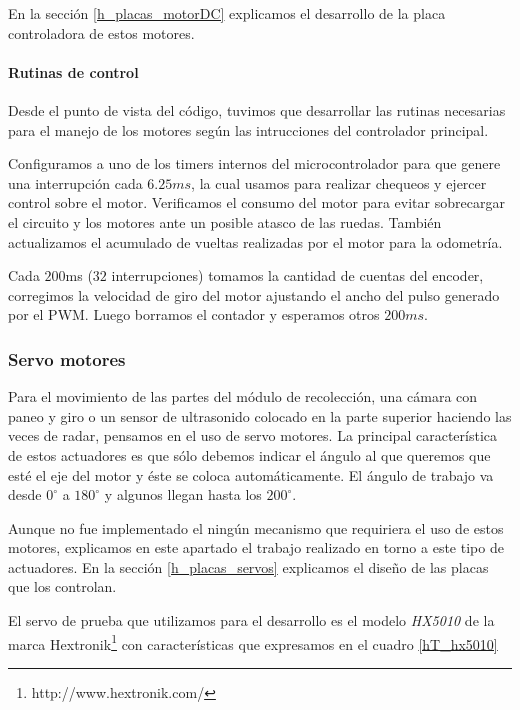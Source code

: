 En la secci\'on \ref{h_placas_motorDC} explicamos el desarrollo de la placa controladora de estos motores.

\paragraph{Rutinas de control}
\label{h_actuadores_motorDC_rutinas}

Desde el punto de vista del c\'odigo, tuvimos que desarrollar las rutinas necesarias para el manejo de los motores seg\'un las intrucciones del
controlador principal.

Configuramos a uno de los timers internos del microcontrolador para que genere una interrupci\'on cada $6.25ms$, la cual usamos para realizar
chequeos y ejercer control sobre el motor.
Verificamos el consumo del motor para evitar sobrecargar el circuito y los motores ante un posible atasco de las ruedas.
Tambi\'en actualizamos el acumulado de vueltas realizadas por el motor para la odometr\'ia.

Cada $200$ms ($32$ interrupciones) tomamos la cantidad de cuentas del encoder, corregimos la velocidad de giro del motor ajustando el
ancho del pulso generado por el PWM.
Luego borramos el contador y esperamos otros $200ms$.

\subsubsection{Servo motores}
\label{h_actuadores_servo}

Para el movimiento de las partes del m\'odulo de recolecci\'on, una c\'amara con paneo y giro o un sensor de ultrasonido colocado
en la parte superior haciendo las veces de radar, pensamos en el uso de servo motores.
La principal caracter\'istica de estos actuadores es que s\'olo debemos indicar el \'angulo al que queremos que est\'e
el eje del motor y \'este se coloca autom\'aticamente.
El \'angulo de trabajo va desde $0^{\circ}$ a $180^{\circ}$ y algunos llegan hasta los $200^{\circ}$.

Aunque no fue implementado el ning\'un mecanismo que requiriera el uso de estos motores, explicamos en este apartado el trabajo realizado
en torno a este tipo de actuadores.
En la secci\'on \ref{h_placas_servos} explicamos el dise\~no de las placas que los controlan.

El servo de prueba que utilizamos para el desarrollo es el modelo \emph{HX5010} de la marca Hextronik\footnote{http://www.hextronik.com/}
con caracter\'isticas que expresamos en el cuadro \ref{hT_hx5010}

